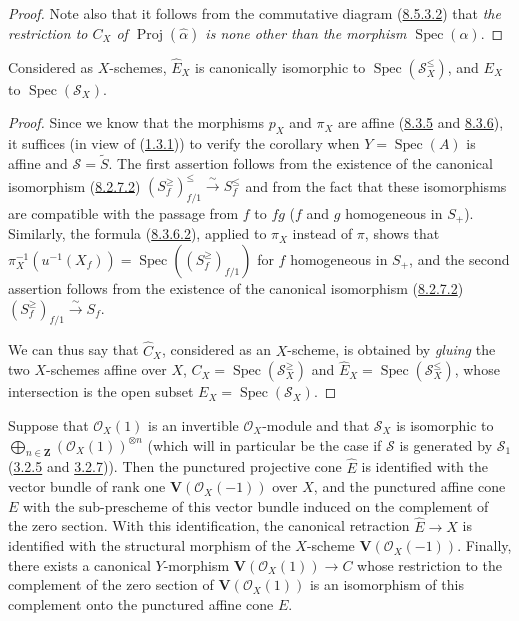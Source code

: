 \begin{proof}
Note also that it follows from the commutative diagram
(\hyperref[II.8.5.3.2]{8.5.3.2}) that \emph{the restriction to $C_X$ of
$\operatorname{Proj}(\widehat{\alpha})$ is none other than the morphism
$\operatorname{Spec}(\alpha)$}.
\end{proof}

\begin{corollary}[8.6.3]
\label{II.8.6.3}
Considered as $X$-schemes, $\widehat{E}_X$ is canonically isomorphic to
$\operatorname{Spec}(\mathcal{S}_X^{\leq})$, and $E_X$ to
$\operatorname{Spec}(\mathcal{S}_X)$.
\end{corollary}

\begin{proof}
Since we know that the morphisms $p_X$ and $\pi_X$ are affine
(\hyperref[II.8.3.5]{8.3.5} and
\hyperref[II.8.3.6]{8.3.6}), it suffices (in view of
(\hyperref[II.1.3.1]{1.3.1})) to verify the corollary when
$Y=\operatorname{Spec}(A)$ is affine and $\mathcal{S}=\widetilde{S}$. The
first assertion follows from the existence of the canonical isomorphism
(\hyperref[II.8.2.7.2]{8.2.7.2})
$(S_f^{\geq})_{f/1}^{\leq}\xrightarrow{\sim}S_f^{\leq}$ and from the fact that these
isomorphisms are compatible with the passage from $f$ to $fg$ ($f$ and $g$
homogeneous in $S_+$). Similarly, the formula
(\hyperref[II.8.3.6.2]{8.3.6.2}), applied to $\pi_X$ instead of $\pi$,
shows that
$\pi_X^{-1}(u^{-1}(X_f))=
\operatorname{Spec}((S_f^{\geq})_{f/1})$ for $f$ homogeneous in $S_+$, and the
second assertion follows from the existence of the canonical isomorphism
(\hyperref[II.8.2.7.2]{8.2.7.2})
$(S_f^{\geq})_{f/1}\xrightarrow{\sim}S_f$.

We can thus say that $\widehat{C}_X$, considered as an $X$-scheme, is obtained
by \emph{gluing} the two $X$-schemes affine over $X$,
$C_X=\operatorname{Spec}(\mathcal{S}_X^{\geq})$ and
$\widehat{E}_X=\operatorname{Spec}(\mathcal{S}_X^{\leq})$, whose
intersection is the open subset $E_X=\operatorname{Spec}(\mathcal{S}_X)$.
\end{proof}

\begin{corollary}[8.6.4]
\label{II.8.6.4}
Suppose that $\mathcal{O}_X(1)$ is an invertible $\mathcal{O}_X$-module and
that $\mathcal{S}_X$ is isomorphic to
$\bigoplus_{n\in\mathbf{Z}}(\mathcal{O}_X(1))^{\otimes n}$ (which will in
particular be the case if $\mathcal{S}$ is generated by $\mathcal{S}_1$
\textup{(\hyperref[II.3.2.5]{3.2.5} and
\hyperref[II.3.2.7]{3.2.7})}). Then the punctured projective cone
$\widehat{E}$ is identified with the vector bundle of rank one
$\mathbf{V}(\mathcal{O}_X(-1))$ over $X$, and the punctured affine cone $E$ with the
sub-prescheme of this vector bundle induced on the complement of the
zero section. With this identification, the canonical retraction
$\widehat{E}\to X$ is identified with the structural morphism of the $X$-scheme
$\mathbf{V}(\mathcal{O}_X(-1))$. Finally, there exists a canonical $Y$-morphism
$\mathbf{V}(\mathcal{O}_X(1))\to C$ whose restriction to the complement of
the zero section of $\mathbf{V}(\mathcal{O}_X(1))$ is an isomorphism of this
complement onto the punctured affine cone $E$.
\end{corollary}


